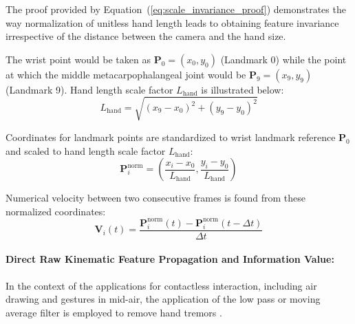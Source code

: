 The proof provided by Equation~(\ref{eq:scale_invariance_proof}) demonstrates the way normalization of unitless hand length leads to obtaining feature invariance irrespective of the distance between the camera and the hand size.

The wrist point would be taken as $\mathbf{P}_0 = (x_0, y_0)$ (Landmark 0) while the point at which the middle metacarpophalangeal joint would be $\mathbf{P}_9 = (x_9, y_9)$ (Landmark 9). Hand length scale factor $L_{\text{hand}}$ is illustrated below:
\begin{equation}
L_{\text{hand}} = \sqrt{(x_9 - x_0)^2 + (y_9 - y_0)^2}
\label{eq:hand_length_scale_def}
\end{equation}

Coordinates for landmark points are standardized to wrist landmark reference $\mathbf{P}_0$ and scaled to hand length scale factor $L_{\text{hand}}$:
\begin{equation}
\mathbf{P}_i^{\text{norm}} = \left( \frac{x_i - x_0}{L_{\text{hand}}}, \frac{y_i - y_0}{L_{\text{hand}}} \right)
\label{eq:normalized_landmark_def}
\end{equation}

Numerical velocity between two consecutive frames is found from these normalized coordinates:
\begin{equation}
\mathbf{V}_i(t) = \frac{\mathbf{P}_i^{\text{norm}}(t) - \mathbf{P}_i^{\text{norm}}(t - \Delta t)}{\Delta t}
\label{eq:joint_velocity_def}
\end{equation}

\paragraph{Direct Raw Kinematic Feature Propagation and Information Value:}
In the context of the applications for contactless interaction, including air drawing and gestures in mid-air, the application of the low pass or moving average filter is employed to remove hand tremors \cite{Kumar2026Hybrid}.

